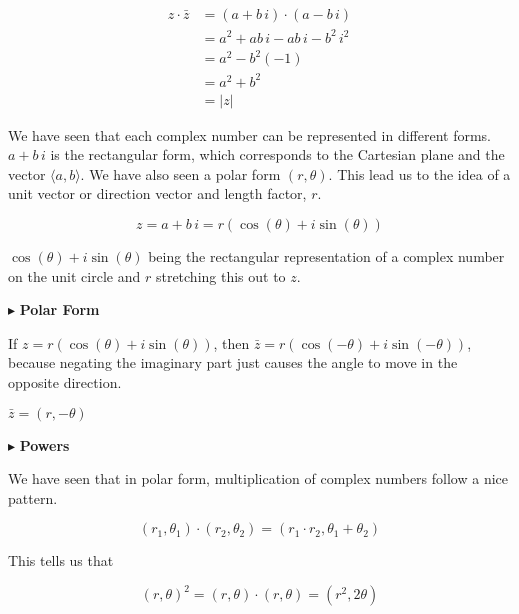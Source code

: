 \documentclass{ximera}
\begin{document}
\begin{explanation}

\begin{align*}
z \cdot \bar{z} &= (a + b \, i) \cdot (a - b \, i) \\
                &= a^2 + ab \, i - ab \, i - b^2 \, i^2 \\
                &= a^2 - b^2 (-1) \\
                &= a^2 + b^2  \\
                &= |z|  
\end{align*}


\end{explanation}






We have seen that each complex number can be represented in different forms.  $a + b \, i$ is the rectangular form, which corresponds to the Cartesian plane and the vector $\langle a, b\rangle$.  We have also seen a polar form $(r, \theta)$.  This lead us to the idea of a unit vector or direction vector and length factor, $r$.

\[ z = a + b \, i = r (\cos(\theta) + i \sin(\theta))  \]


$\cos(\theta) + i \sin(\theta)$ being the rectangular representation of a complex number on the unit circle and $r$ stretching this out to $z$.






$\blacktriangleright$ \textbf{Polar Form}

If $z = r (\cos(\theta) + i \sin(\theta))$, then $\bar{z} = r (\cos(-\theta) + i \sin(-\theta))$, because negating the imaginary part just causes the angle to move in the opposite direction.

$\bar{z} = (r, -\theta)$




$\blacktriangleright$ \textbf{Powers}



We have seen that in polar form, multiplication of complex numbers follow a nice pattern.


\[   (r_1, \theta_1) \cdot (r_2, \theta_2) = (r_1 \cdot r_2, \theta_1 + \theta_2)                \]



This tells us that 


\[   (r, \theta)^2 =  (r, \theta) \cdot (r, \theta) = (r^2, 2\theta)                \]
\end{document}
